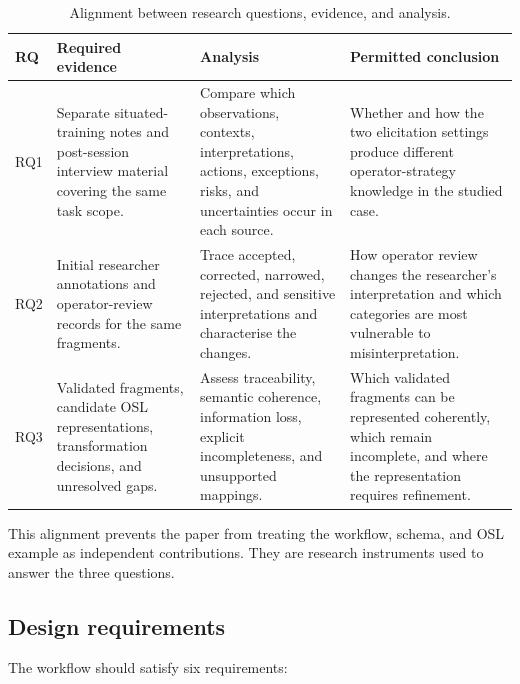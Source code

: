 \begin{table}[htbp]
\centering
\caption{Alignment between research questions, evidence, and analysis.}
\label{tab:rq-alignment}
\begin{tabularx}{\textwidth}{p{}p{}p{}X}
\toprule
RQ & Required evidence & Analysis & Permitted conclusion \\
\midrule
RQ1 & Separate situated-training notes and post-session interview material covering the same task scope. & Compare which observations, contexts, interpretations, actions, exceptions, risks, and uncertainties occur in each source. & Whether and how the two elicitation settings produce different operator-strategy knowledge in the studied case. \\
RQ2 & Initial researcher annotations and operator-review records for the same fragments. & Trace accepted, corrected, narrowed, rejected, and sensitive interpretations and characterise the changes. & How operator review changes the researcher's interpretation and which categories are most vulnerable to misinterpretation. \\
RQ3 & Validated fragments, candidate OSL representations, transformation decisions, and unresolved gaps. & Assess traceability, semantic coherence, information loss, explicit incompleteness, and unsupported mappings. & Which validated fragments can be represented coherently, which remain incomplete, and where the representation requires refinement. \\
\bottomrule
\end{tabularx}
\end{table}

This alignment prevents the paper from treating the workflow, schema, and OSL example as independent contributions. They are research instruments used to answer the three questions.

\subsection{Design requirements}

The workflow should satisfy six requirements:

